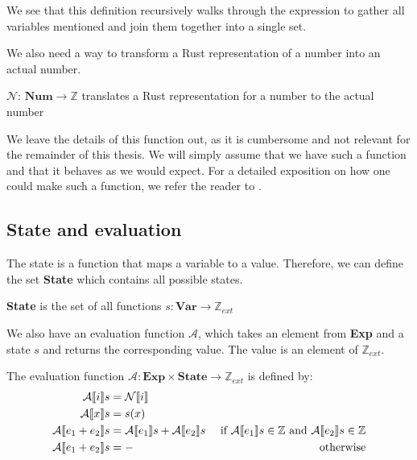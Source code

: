 We see that this definition recursively walks through the expression to gather all variables mentioned and join them together into a single set. 

We also need a way to transform a Rust representation of a number into an actual number. 

\begin{infdefinition}
$\mathcal{N}$: $\textbf{Num} \to \mathbb{Z}$ translates a Rust representation for a number to the actual number
\end{infdefinition}

We leave the details of this function out, as it is cumbersome and not relevant for the remainder of this thesis. We will simply assume that we have such a function and that it behaves as we would expect. For a detailed exposition on how one could make such a function, we refer the reader to  \cite{nielson1992semantics}. 

\subsection*{State and evaluation}
The state is a function that maps a variable to a value. Therefore, we can define the set \textbf{State} which contains all possible states. 

\begin{definition}
\textbf{State} is the set of all functions $s: \textbf{Var} \to \mathbb{Z}_{ext}$
\end{definition}

We also have an evaluation function $\mathcal{A}$, which takes an element from \textbf{Exp} and a state $s$ and returns the corresponding value. The value is an element of $\mathbb{Z}_{ext}$.

\begin{definition}
The evaluation function $\mathcal{A}: \textbf{Exp} \times \textbf{State} \to \mathbb{Z}_{ext}$ is defined by:
\begin{align*}
    \mathcal{A} \llbracket i \rrbracket s          &= \mathcal{N} \llbracket i \rrbracket &
\\  \mathcal{A} \llbracket x \rrbracket s          &= s(x) &
\\  \mathcal{A} \llbracket e_1 + e_2 \rrbracket s  &= \mathcal{A} \llbracket e_1 \rrbracket s + \mathcal{A} \llbracket e_2 \rrbracket s & \textrm{ if } \mathcal{A} \llbracket e_1 \rrbracket s \in \mathbb{Z} \textrm{ and } \mathcal{A} \llbracket e_2 \rrbracket s \in \mathbb{Z}
\\  \mathcal{A} \llbracket e_1 + e_2 \rrbracket s  &= - & \textrm{ otherwise}
\end{align*}
\end{definition}

